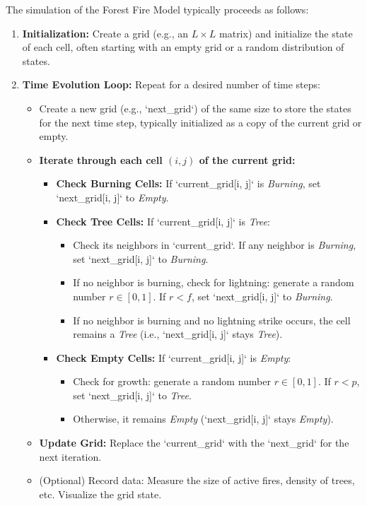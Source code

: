 \documentclass{article}
\begin{document}
The simulation of the Forest Fire Model typically proceeds as follows:

\begin{enumerate}
    \item \textbf{Initialization:} Create a grid (e.g., an $L \times L$ matrix) and initialize the state of each cell, often starting with an empty grid or a random distribution of states.
    \item \textbf{Time Evolution Loop:} Repeat for a desired number of time steps:
        \begin{itemize}
            \item Create a new grid (e.g., `next\_grid`) of the same size to store the states for the next time step, typically initialized as a copy of the current grid or empty.
            \item \textbf{Iterate through each cell $(i, j)$ of the current grid:}
                \begin{itemize}
                    \item \textbf{Check Burning Cells:} If `current\_grid[i, j]` is \emph{Burning}, set `next\_grid[i, j]` to \emph{Empty}.
                    \item \textbf{Check Tree Cells:} If `current\_grid[i, j]` is \emph{Tree}:
                        \begin{itemize}
                            \item Check its neighbors in `current\_grid`. If any neighbor is \emph{Burning}, set `next\_grid[i, j]` to \emph{Burning}.
                            \item If no neighbor is burning, check for lightning: generate a random number $r \in [0, 1]$. If $r < f$, set `next\_grid[i, j]` to \emph{Burning}.
                            \item If no neighbor is burning and no lightning strike occurs, the cell remains a \emph{Tree} (i.e., `next\_grid[i, j]` stays \emph{Tree}).
                        \end{itemize}
                    \item \textbf{Check Empty Cells:} If `current\_grid[i, j]` is \emph{Empty}:
                        \begin{itemize}
                            \item Check for growth: generate a random number $r \in [0, 1]$. If $r < p$, set `next\_grid[i, j]` to \emph{Tree}.
                            \item Otherwise, it remains \emph{Empty} (`next\_grid[i, j]` stays \emph{Empty}).
                        \end{itemize}
                \end{itemize}
            \item \textbf{Update Grid:} Replace the `current\_grid` with the `next\_grid` for the next iteration.
            \item (Optional) Record data: Measure the size of active fires, density of trees, etc. Visualize the grid state.
        \end{itemize}
\end{enumerate}
\end{document}
